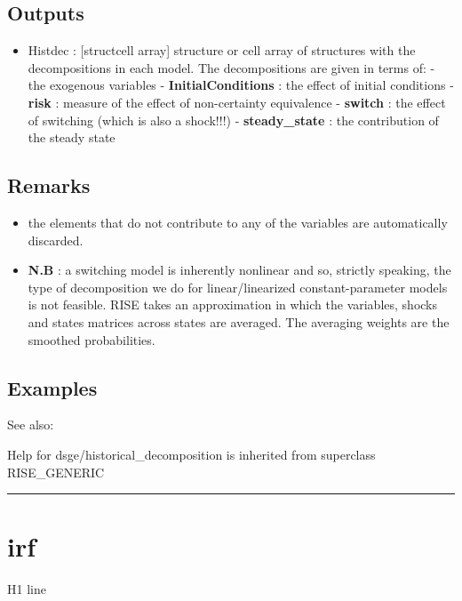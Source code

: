 \documentclass[letterpaper,10pt,english]{sphinxmanual}
\begin{document}
\subsection{Outputs}
\label{classes/models/@dsge/dsge:id75}\begin{itemize}
\item {} 
Histdec : {[}struct\textbar{}cell array{]} structure or cell array of structures
with the decompositions in each model. The decompositions are given in
terms of:
- the exogenous variables
- \textbf{InitialConditions} : the effect of initial conditions
- \textbf{risk} : measure of the effect of non-certainty equivalence
- \textbf{switch} : the effect of switching (which is also a shock!!!)
- \textbf{steady\_state} : the contribution of the steady state

\end{itemize}


\subsection{Remarks}
\label{classes/models/@dsge/dsge:remarks}\begin{itemize}
\item {} 
the elements that do not contribute to any of the variables are
automatically discarded.

\item {} 
\textbf{N.B} : a switching model is inherently nonlinear and so, strictly
speaking, the type of decomposition we do for linear/linearized
constant-parameter models is not feasible. RISE takes an approximation
in which the variables, shocks and states matrices across states are
averaged. The averaging weights are the smoothed probabilities.

\end{itemize}


\subsection{Examples}
\label{classes/models/@dsge/dsge:id76}
See also:

Help for dsge/historical\_decomposition is inherited from superclass RISE\_GENERIC


\bigskip\hrule{}\bigskip



\section{irf}
\label{classes/models/@dsge/dsge:id77}\label{classes/models/@dsge/dsge:irf}
H1 line
\end{document}
